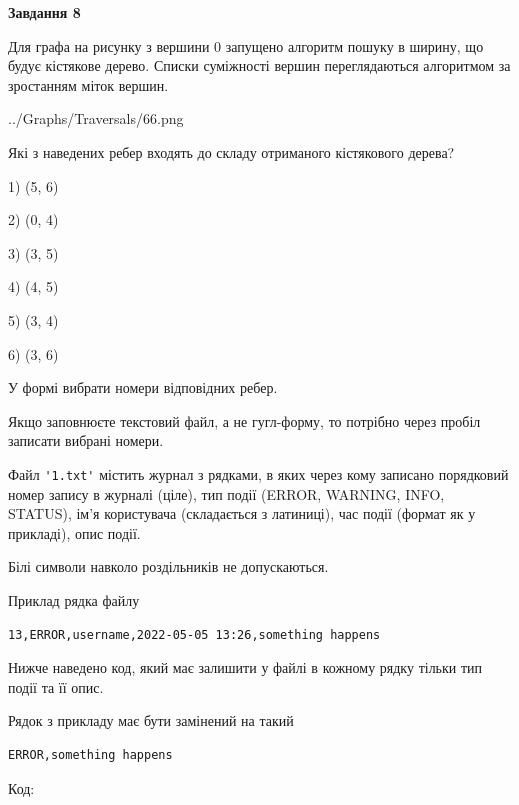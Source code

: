 \documentclass[12pt, ukrainian]{article}
\def\code#1{\Verb!#1!}
\begin{document}
{\begin {large}
{\begin {center}\textbf{Завдання 8}\end {center}}\par
Для графа на рисунку з вершини 0 запущено алгоритм пошуку в ширину, що будує кістякове дерево. Списки суміжності вершин переглядаються алгоритмом за зростанням міток вершин.\par
\begin{center}
	{../Graphs/Traversals/66.png}
\end{center}
\par Які з наведених ребер входять до складу отриманого кістякового дерева?\par
1) (5, 6)\par
2) (0, 4)\par
3) (3, 5)\par
4) (4, 5)\par
5) (3, 4)\par
6) (3, 6)\par
{\vskip 15pt} У формі вибрати номери відповідних ребер.


Якщо заповнюєте текстовий файл, а не гугл-форму, то потрібно через пробіл записа\-ти вибрані номери.\par
\newpage


Файл \code{'1.txt'} містить журнал з рядками, в яких через кому записано поряд\-ко\-вий номер запису в журналі (ціле), тип події (ERROR, WARNING, INFO, STATUS), ім'я користувача (складається з латиниці), час події (фор\-мат як у прикладі), опис події.

Білі символи навколо роздільників не допускаються.

Приклад рядка файлу



\begin{verbatim}
13,ERROR,username,2022-05-05 13:26,something happens
\end{verbatim}


Нижче наведено код, який має залишити у файлі в кожному рядку тільки тип події та її опис.

Рядок з прикладу має бути замінений на такий



\begin{verbatim}
ERROR,something happens
\end{verbatim}




Код:




\end{large}}
\end{document}
